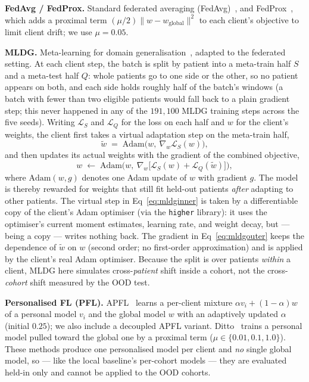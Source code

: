 \documentclass[10pt,letterpaper]{article}
\begin{document}
\textbf{FedAvg / FedProx.} Standard federated averaging
(FedAvg)~\cite{mcmahan2017fedavg}, and FedProx~\cite{li2020fedprox}, which adds
a proximal term $(\mu/2)\lVert w - w_{\text{global}}\rVert^2$ to each client's
objective to limit client drift; we use $\mu=0.05$.

\textbf{MLDG.} Meta-learning for domain generalisation~\cite{li2018mldg},
adapted to the federated setting. At each client step, the batch is split by
patient into a meta-train half $S$ and a meta-test half $Q$: whole patients go
to one side or the other, so no patient appears on both, and each side holds
roughly half of the batch's windows (a batch with fewer than two eligible
patients would fall back to a plain gradient step; this never happened in any
of the $191{,}100$ MLDG training steps across the five seeds). Writing
$\mathcal{L}_S$ and $\mathcal{L}_Q$ for the loss on each half and $w$ for the
client's weights, the client first takes a virtual adaptation step on the
meta-train half,
\begin{equation}\label{eq:mldginner}
\tilde{w} \;=\; \mathrm{Adam}\big(w,\ \nabla_w \mathcal{L}_S(w)\big),
\end{equation}
and then updates its actual weights with the gradient of the combined
objective,
\begin{equation}\label{eq:mldgouter}
w \;\leftarrow\; \mathrm{Adam}\big(w,\ \nabla_w\big[\mathcal{L}_S(w) +
\mathcal{L}_Q(\tilde{w})\big]\big),
\end{equation}
where $\mathrm{Adam}(w, g)$ denotes one Adam update of $w$ with gradient $g$.
The model is thereby rewarded for weights that still fit held-out patients
\emph{after} adapting to other patients. The virtual step in
Eq~\eqref{eq:mldginner} is taken by a differentiable copy of the client's Adam
optimiser (via the \texttt{higher} library): it uses the optimiser's current
moment estimates, learning rate, and weight decay, but --- being a copy ---
writes nothing back. The gradient in Eq~\eqref{eq:mldgouter} keeps the
dependence of $\tilde{w}$ on $w$ (second order; no first-order approximation)
and is applied by the client's real Adam optimiser. Because the split is over
patients \emph{within} a client, MLDG here simulates cross-\emph{patient}
shift inside a cohort, not the cross-\emph{cohort} shift measured by the OOD
test.

\textbf{Personalised FL (PFL).} APFL~\cite{deng2020apfl} learns a per-client
mixture $\alpha v_i + (1-\alpha)w$ of a personal model $v_i$ and the global
model $w$ with an adaptively updated $\alpha$ (initial $0.25$); we also include
a decoupled APFL variant. Ditto~\cite{li2021ditto} trains a personal model
pulled toward the global one by a proximal term ($\mu\in\{0.01,0.1,1.0\}$). These methods produce one personalised
model per client and \emph{no} single global model, so --- like the local
baseline's per-cohort models --- they are evaluated held-in only and cannot be
applied to the OOD cohorts.
\end{document}
